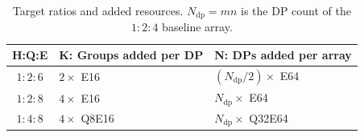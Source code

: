 \begin{table}[t]
\centering
\caption{Target ratios and added resources. $N_{\mathrm{dp}}=mn$ is the DP count of the $1:2:4$ baseline array.}
\label{tab:brick_compositions}
\begingroup\footnotesize\setlength{\tabcolsep}{3pt}
\begin{tabular*}{\columnwidth}{@{\extracolsep{\fill}}cll@{}}\toprule
H:Q:E & K: Groups added per DP & N: DPs added per array \\\midrule
$1:2:6$ & $2\times$ E16 & $(N_{\mathrm{dp}}/2)\times$ E64 \\
$1:2:8$ & $4\times$ E16 & $N_{\mathrm{dp}}\times$ E64 \\
$1:4:8$ & $4\times$ Q8E16 & $N_{\mathrm{dp}}\times$ Q32E64 \\
\bottomrule
\end{tabular*}\endgroup
\end{table}
